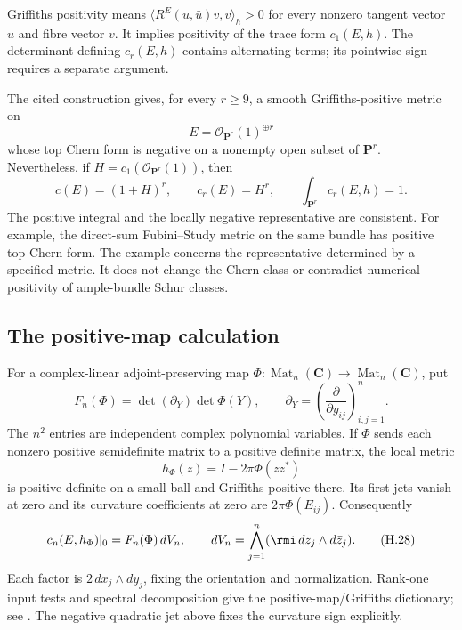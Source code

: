Griffiths positivity means
$\langle R^E(u,\bar u)v,v\rangle_h>0$ for every nonzero tangent
vector $u$ and fibre vector $v$. It implies positivity of the trace
form $c_1(E,h)$. The determinant defining $c_r(E,h)$ contains
alternating terms; its pointwise sign requires a separate argument.

The cited construction gives, for every $r\geq9$, a smooth
Griffiths-positive metric on
\[
 E=\mathcal O_{\mathbf P^r}(1)^{\oplus r}
\]
whose top Chern form is negative on a nonempty open subset of
$\mathbf P^r$. Nevertheless, if
$H=c_1(\mathcal O_{\mathbf P^r}(1))$, then
\begin{equation*}
 c(E)=(1+H)^r,\qquad c_r(E)=H^r,\qquad
 \int_{\mathbf P^r}c_r(E,h)=1.
 \tag{H.26}\label{eq:appH-Chern-number}
\end{equation*}
The positive integral and the locally negative representative are
consistent. For example, the direct-sum Fubini--Study metric on the
same bundle has positive top Chern form. The example concerns the
representative determined by a specified metric. It does not change
the Chern class or contradict numerical positivity of ample-bundle
Schur classes.

\subsection{The positive-map calculation}
\label{sec:appH-Chern-positive-map}

For a complex-linear adjoint-preserving map
$\Phi:\operatorname{Mat}_n(\mathbf C)\to
\operatorname{Mat}_n(\mathbf C)$, put
\begin{equation*}
 F_n(\Phi)=\det(\partial_Y)\det\Phi(Y),\qquad
 \partial_Y=\left(\frac{\partial}{\partial y_{ij}}\right)_{i,j=1}^n.
 \tag{H.27}\label{eq:appH-Chern-det-pairing}
\end{equation*}
The $n^2$ entries are independent complex polynomial variables.
If $\Phi$ sends each nonzero positive semidefinite matrix to a
positive definite matrix, the local metric
\[
 h_\Phi(z)=I-2\pi\Phi(zz^*)
\]
is positive definite on a small ball and Griffiths positive there.
Its first jets vanish at zero and its curvature coefficients at zero
are $2\pi\Phi(E_{ij})$. Consequently
\begin{equation*}
 c_n(E,h_\Phi)|_0=F_n(\Phi)\,dV_n,\qquad
 dV_n=\bigwedge_{j=1}^n(\rmi\,dz_j\wedge d\bar z_j).
 \tag{H.28}\label{eq:appH-Chern-local-volume}
\end{equation*}
Each factor is $2\,dx_j\wedge dy_j$, fixing the orientation and
normalization. Rank-one input tests and spectral decomposition give
the positive-map/Griffiths dictionary; see
\cite[Propositions~2.10--2.11]{Finski22CharacteristicPublished}.
The negative quadratic jet above fixes the curvature sign explicitly.

